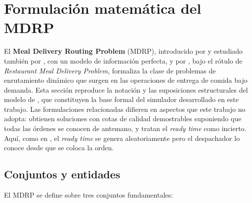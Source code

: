 \documentclass[12pt,letterpaper,oneside]{book}
\begin{document}
	\section{Formulación matemática del MDRP}

	El \textbf{Meal Delivery Routing Problem} (MDRP), introducido por
	\citet{Reyes2018} y estudiado también por \citet{Yildiz2019MealDelivery},
	con un modelo de información perfecta, y por \citet{Ulmer2021RMDP}, bajo el
	rótulo de \emph{Restaurant Meal Delivery Problem}, formaliza la clase de
	problemas de enrutamiento dinámico que surgen en las operaciones de entrega
	de comida bajo demanda.  Esta sección reproduce la notación y las
	suposiciones estructurales del modelo de \citet{Reyes2018}, que
	constituyen la base formal del simulador desarrollado en este trabajo.
	Las formulaciones relacionadas difieren en aspectos que este trabajo no
	adopta: \citet{Yildiz2019MealDelivery} obtienen soluciones con cotas de
	calidad demostrables suponiendo que todas las órdenes se conocen de
	antemano, y \citet{Ulmer2021RMDP} tratan el \textit{ready time} como
	incierto.  Aquí, como en \citet{Reyes2018}, el \textit{ready time} se
	genera aleatoriamente pero el despachador lo conoce desde que se coloca la
	orden.

	\subsection{Conjuntos y entidades}

	El MDRP se define sobre tres conjuntos fundamentales:
\end{document}
